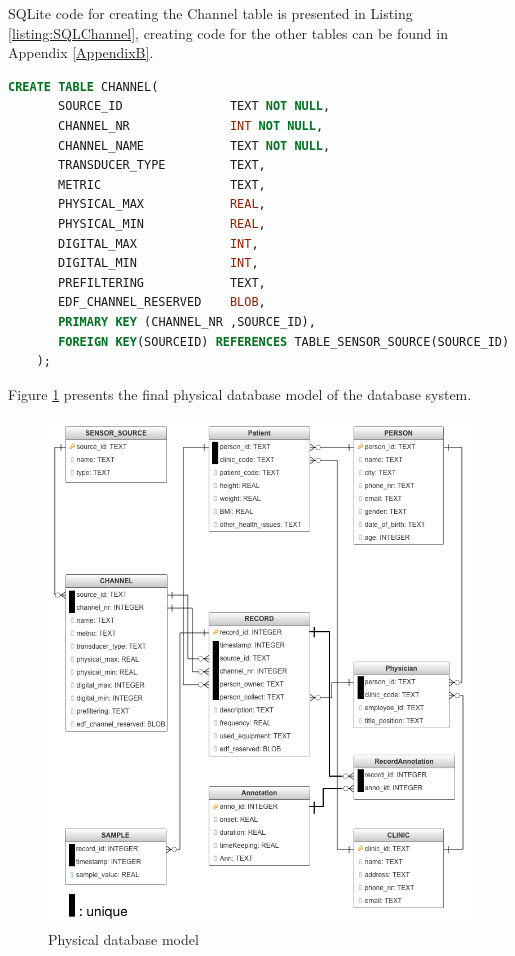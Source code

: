 SQLite code for creating the Channel table is presented in Listing \ref{listing:SQLChannel}, creating code for the other tables can be found in Appendix \ref{AppendixB}.\\
\begin{minipage}{\linewidth}
\begin{lstlisting}[caption={SQLite code for creating table Channel}, label = {listing:SQLChannel},language=SQL]
    CREATE TABLE CHANNEL(
	   SOURCE_ID               TEXT NOT NULL,
	   CHANNEL_NR              INT NOT NULL,
	   CHANNEL_NAME            TEXT NOT NULL,
	   TRANSDUCER_TYPE         TEXT,
	   METRIC                  TEXT,
	   PHYSICAL_MAX            REAL,
	   PHYSICAL_MIN            REAL,
	   DIGITAL_MAX             INT,
	   DIGITAL_MIN             INT,
	   PREFILTERING            TEXT,
	   EDF_CHANNEL_RESERVED    BLOB,
	   PRIMARY KEY (CHANNEL_NR ,SOURCE_ID),
       FOREIGN KEY(SOURCEID) REFERENCES TABLE_SENSOR_SOURCE(SOURCE_ID)
	);
\end{lstlisting}
\end{minipage}
Figure \ref{fig:Figures/FinalTable} presents the final physical database model of the database system.
\begin{figure}
    \centering
    \includegraphics[width=1.0\textwidth]{Figures/FinalTable.png}
    \caption{Physical database model}
    \label{fig:Figures/FinalTable}
\end{figure}
